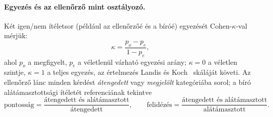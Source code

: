 \paragraph{Egyezés és az ellenőrző mint osztályozó.} Két igen/nem ítéletsor (például az ellenőrzőé és a
bíróé) egyezését Cohen-$\kappa$-val~\cite{cohen1960kappa} mérjük:
\begin{equation}
\kappa=\frac{p_o-p_e}{1-p_e},
\label{eq:kappa}
\end{equation}
ahol $p_o$ a megfigyelt, $p_e$ a véletlenül várható egyezési arány; $\kappa=0$ a véletlen szintje,
$\kappa=1$ a teljes egyezés, az értelmezés Landis és Koch~\cite{landis1977} skáláját követi. Az ellenőrző
lánc minden kérdést \emph{átengedett} vagy \emph{megjelölt} kategóriába sorol; a bíró alátámasztottsági
ítéletét referenciának tekintve
\begin{equation}
\text{pontosság}=\frac{\text{átengedett és alátámasztott}}{\text{átengedett}},\qquad
\text{felidézés}=\frac{\text{átengedett és alátámasztott}}{\text{alátámasztott}}.
\label{eq:precrec}
\end{equation}

